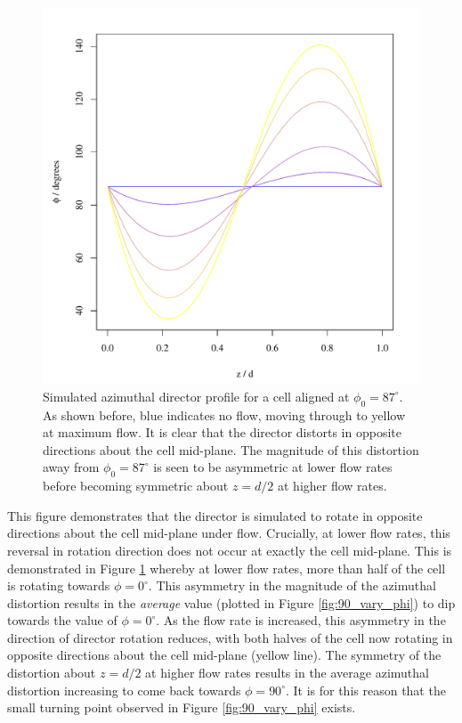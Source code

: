 \begin{figure}
\begin{center}
\includegraphics{Figures/90/uniform_twist_profile_sparce}
\end{center}
\caption[Simulated director twist profiles for the uniform state]{\label{fig:90_twist_profile_sparce}Simulated azimuthal director profile for a cell aligned at $\phi_0=87^{\circ}$. As shown before, blue indicates no flow, moving through to yellow at maximum flow. It is clear that the director distorts in opposite directions about the cell mid-plane. The magnitude of this distortion away from $\phi_0=87^{\circ}$ is seen to be asymmetric at lower flow rates before becoming symmetric about $z=d/2$ at higher flow rates.}
\end{figure}

This figure demonstrates that the director is simulated to rotate in opposite directions about the cell mid-plane under flow. Crucially, at lower flow rates, this reversal in rotation direction does not occur at exactly the cell mid-plane. This is demonstrated in Figure \ref{fig:90_twist_profile_sparce} whereby at lower flow rates, more than half of the cell is rotating towards $\phi=0^{\circ}$. This asymmetry in the magnitude of the azimuthal distortion results in the \textit{average} value (plotted in Figure \ref{fig:90_vary_phi}) to dip towards the value of $\phi=0^{\circ}$. As the flow rate is increased, this asymmetry in the direction of director rotation reduces, with both halves of the cell now rotating in opposite directions about the cell mid-plane (yellow line). The symmetry of the distortion about $z=d/2$ at higher flow rates results in the average azimuthal distortion increasing to come back towards $\phi=90^{\circ}$. It is for this reason that the small turning point observed in Figure \ref{fig:90_vary_phi} exists.


